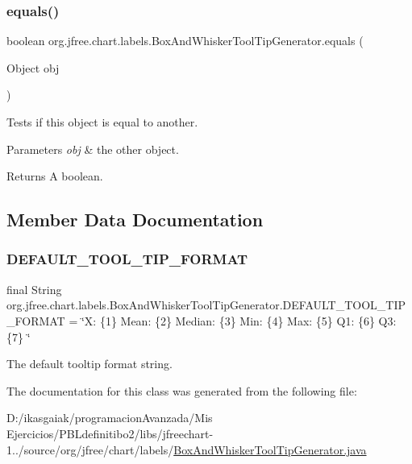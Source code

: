 \subsubsection{\texorpdfstring{equals()}{equals()}}
{\footnotesize\ttfamily boolean org.\+jfree.\+chart.\+labels.\+Box\+And\+Whisker\+Tool\+Tip\+Generator.\+equals (\begin{DoxyParamCaption}\item[{Object}]{obj }\end{DoxyParamCaption})}

Tests if this object is equal to another.


\begin{DoxyParams}{Parameters}
{\em obj} & the other object.\\
\hline
\end{DoxyParams}
\begin{DoxyReturn}{Returns}
A boolean. 
\end{DoxyReturn}


\subsection{Member Data Documentation}
\mbox{\label{classorg_1_1jfree_1_1chart_1_1labels_1_1_box_and_whisker_tool_tip_generator_a95e604a7ae781bff45237841a08da6ce}} 
\subsubsection{\texorpdfstring{D\+E\+F\+A\+U\+L\+T\+\_\+\+T\+O\+O\+L\+\_\+\+T\+I\+P\+\_\+\+F\+O\+R\+M\+AT}{DEFAULT\_TOOL\_TIP\_FORMAT}}
{\footnotesize\ttfamily final String org.\+jfree.\+chart.\+labels.\+Box\+And\+Whisker\+Tool\+Tip\+Generator.\+D\+E\+F\+A\+U\+L\+T\+\_\+\+T\+O\+O\+L\+\_\+\+T\+I\+P\+\_\+\+F\+O\+R\+M\+AT = \char`\"{}X\+: \{1\} Mean\+: \{2\} Median\+: \{3\} Min\+: \{4\} Max\+: \{5\} Q1\+: \{6\} Q3\+: \{7\} \char`\"{}\hspace{0.3cm}{\ttfamily [static]}}

The default tooltip format string. 

The documentation for this class was generated from the following file\+:\begin{DoxyCompactItemize}
\item 
D\+:/ikasgaiak/programacion\+Avanzada/\+Mis Ejercicios/\+P\+B\+Ldefinitibo2/libs/jfreechart-\/1../source/org/jfree/chart/labels/\mbox{\hyperlink{_box_and_whisker_tool_tip_generator_8java}{Box\+And\+Whisker\+Tool\+Tip\+Generator.\+java}}\end{DoxyCompactItemize}
